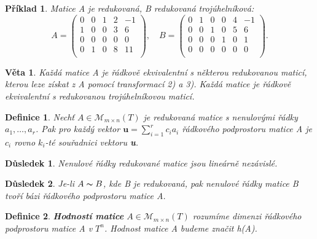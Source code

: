 \documentclass[12pt,a4paper]{article}
\newtheorem{definition}{Definice}
\newtheorem{sentence}{Věta}
\newtheorem{example}{Příklad}
\newtheorem{result}{Důsledek}
\begin{document}
\begin{example}
 Matice A je redukovaná, B redukovaná trojúhelníková:
\begin{displaymath}
	A = \left( \begin{array}{ccccc}
	0 & 0 & 1 & 2 & -1 \\
	1 & 0 & 0 & 3 & 6 \\
	0 & 0 & 0 & 0 & 0 \\
	0 & 1 & 0 & 8 & 11 \\
	\end{array}\right), \quad 
	B = \left( \begin{array}{cccccc}
	0 & 1 & 0 & 0 & 4 & -1 \\
	0 & 0 & 1 & 0 & 5 & 6 \\
	0 & 0 & 0 & 1 & 0 & 1 \\
	0 & 0 & 0 & 0 & 0 & 0 \\
	\end{array}\right).
\end{displaymath}
\end{example}

\begin{sentence}
	Každá matice A je řádkově ekvivalentní s některou redukovanou maticí, kterou leze získat z A pomocí transformací 2) a 3). Každá matice je řádkově ekvivalentní s redukovanou trojúhelníkovou maticí.
\end{sentence}

\begin{definition}
	Nechť $A \in \mathscr{M}_{m \times n}(T)$ je redukovaná matice s nenulovými řádky $a_1,\dots, a_r$. Pak pro každý vektor $\textbf{u} = \sum_{i=1}^r c_i a_i$ řádkového podprostoru matice A je $c_i$ rovno $k_i$-té souřadnici vektoru \textbf{u}. 
\end{definition}

\begin{result}
	Nenulové řádky redukované matice jsou lineárně nezávislé.
\end{result}

\begin{result}
	Je-li $A \thicksim B$, kde B je redukovaná, pak nenulové řádky matice B tvoří bázi řádkového podprostoru matice A.
\end{result}

\begin{definition}
	\textbf{Hodností matice} $A \in \mathscr{M}_{m \times n}(T)$ rozumíme dimenzi řádkového podprostoru matice A v $T^n$. Hodnost matice A budeme značit h(A).
\end{definition}
\end{document}
